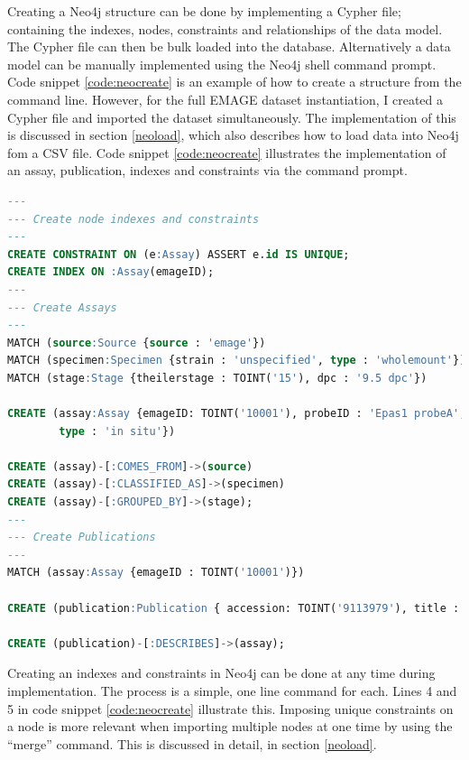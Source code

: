 Creating a Neo4j structure can be done by implementing a Cypher file; containing the indexes, nodes, constraints and relationships of the data model. The Cypher file can then be bulk loaded into the database. Alternatively a data model can be manually implemented using the Neo4j shell command prompt. Code snippet \ref{code:neocreate} is an example of how to create a structure from the command line. However, for the full EMAGE dataset instantiation, I created a Cypher file and imported the dataset simultaneously. The implementation of this is discussed in section \ref{neoload}, which also describes how to load data into Neo4j fom a CSV file. Code snippet \ref{code:neocreate} illustrates the implementation of an assay, publication, indexes and constraints via the command prompt.
\newpage
\vspace*{\fill}
\begin{lstlisting}[language=SQL, caption=Example creation of an assay\, publication\, indexes and constraints in Neo4j., label=code:neocreate]
---
--- Create node indexes and constraints
---
CREATE CONSTRAINT ON (e:Assay) ASSERT e.id IS UNIQUE;
CREATE INDEX ON :Assay(emageID);
---
--- Create Assays
---
MATCH (source:Source {source : 'emage'})
MATCH (specimen:Specimen {strain : 'unspecified', type : 'wholemount'})
MATCH (stage:Stage {theilerstage : TOINT('15'), dpc : '9.5 dpc'})

CREATE (assay:Assay {emageID: TOINT('10001'), probeID : 'Epas1 probeA',
		type : 'in situ'})

CREATE (assay)-[:COMES_FROM]->(source)
CREATE (assay)-[:CLASSIFIED_AS]->(specimen)
CREATE (assay)-[:GROUPED_BY]->(stage);
---
--- Create Publications
---
MATCH (assay:Assay {emageID : TOINT('10001')})

CREATE (publication:Publication { accession: TOINT('9113979'), title : 'A novel bHLH-PAS factor with close sequence similarity to hypoxia-inducible factor 1alpha regulates the VEGF expression and is potentially involved in lung and vascular development.', author : 'Ema M, Taya S, Yokotani N, Sogawa K, Matsuda Y, Fujii-Kuriyama Y'})

CREATE (publication)-[:DESCRIBES]->(assay);
\end{lstlisting}
\vspace*{\fill}
\newpage

Creating an indexes and constraints in Neo4j can be done at any time during implementation. The process is a simple, one line command for each. Lines 4 and 5 in code snippet \ref{code:neocreate} illustrate this. Imposing unique constraints on a node is more relevant when importing multiple nodes at one time by using the ``merge'' command. This is discussed in detail, in section \ref{neoload}.

